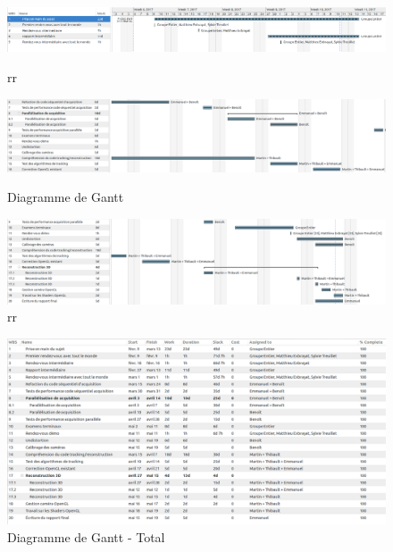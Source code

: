 \documentclass{article}
\begin{document}
\begin{figure}
 \begin{minipage}{.5\textwidth}
  \includegraphics[scale=0.5, angle=90]{Modules/Picture/gantt_final_0}
  \caption{rr}
 \end{minipage}
 \begin{minipage}{.5\textwidth}
  \includegraphics[scale=0.5, angle=90]{Modules/Picture/gantt_final_1}
  \caption{Diagramme de Gantt}
 \end{minipage}
 \begin{minipage}{.5\textwidth}
  \includegraphics[scale=0.3, angle=90]{Modules/Picture/gantt_final_2}
  \caption{rr}
 \end{minipage}
\end{figure}

\newpage

\begin{figure}[!h]
\centering
\includegraphics[width=\textwidth]{Modules/Picture/tableau_gantt_final}
\caption{Diagramme de Gantt - Total}
\end{figure}
\end{document}

